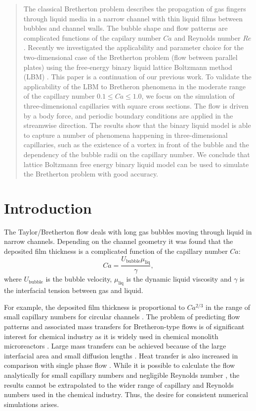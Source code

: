 \documentclass{article}
\begin{document}
\begin{abstract}
The classical Bretherton problem describes the propagation of gas fingers through liquid media in a
narrow channel with
thin liquid films between bubbles and channel walls. The bubble shape and flow patterns are
complicated functions of the capilary number $Ca$ and Reynolds number $Re$. Recently we investigated
the applicability and parameter choice for the two-dimensional case of the Bretherton problem (flow
between parallel plates) using the free-energy binary liquid lattice Boltzmann method (LBM)
\cite{kuzmin-binary2d}. This paper is a continuation of our previous work.  To validate the applicability
of the LBM to Bretheron phenomena in the moderate range of the capillary number $0.1\leq Ca \leq 1.0$,
we focus on the simulation of three-dimensional capillaries with square cross sections.
The flow is driven by a body force, and
periodic boundary conditions are applied in the streamwise direction. The results show that the
binary liquid model is able to capture a number of phenomena happening in three-dimensional
capillaries, such as the existence of a vortex in front of the bubble and the dependency
of the bubble radii on the capillary number.  We conclude that lattice Boltzmann free energy binary
liquid model can be used to simulate the Bretherton problem with good accuracy. 
\end{abstract}

\section{Introduction}
The Taylor/Bretherton \cite{bretherton} flow deals with long gas bubbles moving through liquid in
narrow channels. Depending on the channel geometry it was found that the deposited film thickness
is a complicated function of the capillary number $Ca$:
\begin{equation}
\label{capillary:number:definition}
Ca=\frac{U_{\mathrm{bubble}} \mu_{\mathrm{liq}}}{\gamma},
\end{equation}
where $U_{\mathrm{bubble}}$ is the bubble velocity, $\mu_{\mathrm{liq}}$ is the
dynamic liquid viscosity and $\gamma$ is the interfacial tension between gas and liquid. 

For example, the deposited film thickness
is proportional to $Ca^{2/3}$ in the range of small capillary numbers for circular channels
\cite{bretherton,heil-bretherton}. 
The problem of predicting flow patterns and associated mass transfers for Bretheron-type flows
is of significant interest for chemical industry as it is widely used in chemical monolith
microreactors \cite{kreutzer-pressure-drop}. Large mass transfers can be achieved because of the
large interfacial area and small diffusion lengths \cite{cerro-bubble-train}. Heat transfer is
also increased in comparison with single phase flow \cite{fukugata-levelset}. While it
is possible to calculate the flow analytically for small capillary numbers and negligible Reynolds
number \cite{bretherton}, the
results cannot be extrapolated to the wider range of capillary and Reynolds numbers used in the
chemical industry.  Thus, the desire for consistent numerical simulations arises.
\end{document}
